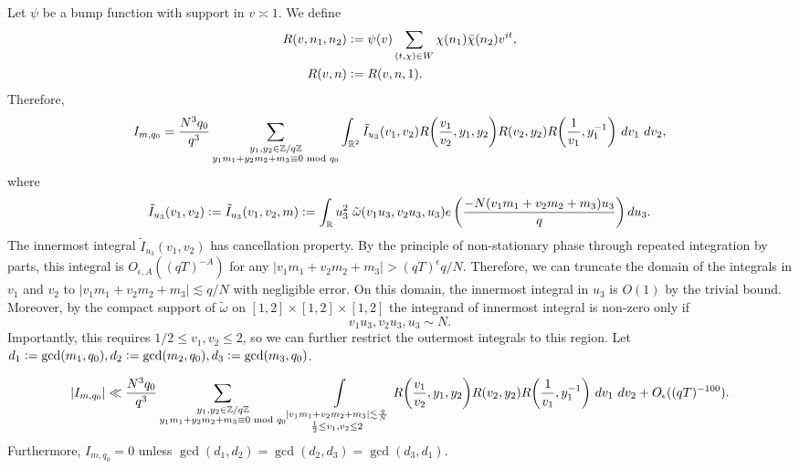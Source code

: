 Let $\psi$ be a bump function with support in $v\asymp 1$. We define \begin{align*}
	R(v,n_1,n_2)&\mathrel{\mathop:}= \psi(v)\sum_{(t,\chi)\in  W} 
	\chi({n_1})\bar{\chi}(n_2)v^{it},\\
	R(v,n)&\mathrel{\mathop:}= R(v,n,1).
\end{align*}
Therefore, \begin{equation*}
	I_{m,q_0} = \frac{N^3q_0}{q^3} \sum_{\substack{y_1,y_2 \in\mathbb{Z}/q\mathbb{Z} \\ y_1m_1+y_2m_2+m_3\equiv 0 \mod q_0}}\int_{\reals^2} \tilde{I}_{u_3}(v_1,v_2)  R{\left(\frac{v_1}{v_2},y_1,y_2\right)}R {\left(v_2,y_2\right)}R{\left(\frac{1}{v_1},y_1^{-1}\right)} \ dv_1\ dv_2,
\end{equation*}
where\[
\tilde{I}_{u_3}(v_1,v_2)\defeq \tilde{I}_{u_3}(v_1,v_2,m)\defeq \int_\reals u_3^2 \ \tilde{\omega}(v_1u_3,v_2u_3,u_3) e\left(\frac{-N(v_1m_1+v_2m_2+m_3)u_3}{q}\right)  du_3.\]
The innermost integral $\tilde{I}_{u_3}(v_1,v_2)$ has cancellation property. By the principle of non-stationary phase through repeated integration by parts, this integral is $O_{\epsilon, A}((qT)^{-A})$ for any $|v_1m_1+v_2m_2+m_3|>(qT)^\epsilon q/N$. Therefore, we can truncate the domain of the integrals in $v_1$ and $v_2$ to  $|v_1m_1+v_2m_2+m_3|\lesssim q/N$ with negligible error. On this domain, the innermost integral in $u_3$ is $O(1)$ by the trivial bound. Moreover, by the compact support of $\tilde{\omega}$ on $[1,2]\times [1,2]\times [1,2]$  the integrand of innermost integral is non-zero only if \[
v_1u_3,v_2u_3,u_3\sim N.
\]
Importantly, this requires $1/2 \leq v_1,v_2 \leq 2$, so we can further restrict the outermost integrals to this region. 
Let $d_1\mathrel{\mathop:}= \gcd (m_1,q_0),d_2\mathrel{\mathop:}= \gcd(m_2,q_0), d_3\mathrel{\mathop:}= \gcd (m_3,q_0)$. 
\begin{proposition} \label{domainreduction}
	\[
	|I_{m,q_0}|\ll \frac{N^3q_0}{q^3}\sum_{\substack{y_1,y_2 \in\mathbb{Z}/q\mathbb{Z} \\ y_1m_1+y_2m_2+m_3\equiv 0 \mod q_0}}\int\displaylimits_{\substack{
			|v_1m_1+v_2m_2+m_3|\lesssim \frac{q}{N}\\
			\frac{1}{2}\leq v_1,v_2\leq 2
	}}  R{\left(\frac{v_1}{v_2},y_1,y_2\right)}R {\left(v_2,y_2\right)}R{\left(\frac{1}{v_1},y_1^{-1}\right)} \ dv_1\ dv_2+O_{\epsilon}((qT)^{-100}).
	\]
	Furthermore, $I_{m,q_0}=0$ unless $\gcd(d_1,d_2)=\gcd(d_2,d_3)=\gcd(d_3,d_1)$.
\end{proposition}
